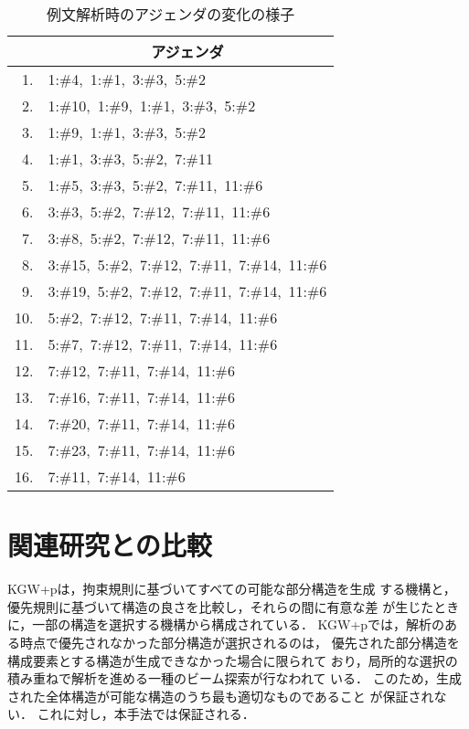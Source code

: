 \begin{table}
\caption{例文解析時のアジェンダの変化の様子}
\label{tab:agenda}
\begin{center}
\begin{tabular}{r|l}\hline
&\multicolumn{1}{|c}{アジェンダ}\\\hline\hline
1. &1:\#4,\ 1:\#1,\ 3:\#3,\ 5:\#2\\
2. &1:\#10,\ 1:\#9,\ 1:\#1,\ 3:\#3,\ 5:\#2\\
3. &1:\#9,\ 1:\#1,\ 3:\#3,\ 5:\#2\\
4. &1:\#1,\ 3:\#3,\ 5:\#2,\ 7:\#11\\
5. &1:\#5,\ 3:\#3,\ 5:\#2,\ 7:\#11,\ 11:\#6\\
6. &3:\#3,\ 5:\#2,\ 7:\#12,\ 7:\#11,\ 11:\#6\\
7. &3:\#8,\ 5:\#2,\ 7:\#12,\ 7:\#11,\ 11:\#6\\
8. &3:\#15,\ 5:\#2,\ 7:\#12,\ 7:\#11,\ 7:\#14,\ 11:\#6\\
9. &3:\#19,\ 5:\#2,\ 7:\#12,\ 7:\#11,\ 7:\#14,\ 11:\#6\\
10.&5:\#2,\ 7:\#12,\ 7:\#11,\ 7:\#14,\ 11:\#6\\
11.&5:\#7,\ 7:\#12,\ 7:\#11,\ 7:\#14,\ 11:\#6\\
12.&7:\#12,\ 7:\#11,\ 7:\#14,\ 11:\#6\\
13.&7:\#16,\ 7:\#11,\ 7:\#14,\ 11:\#6\\
14.&7:\#20,\ 7:\#11,\ 7:\#14,\ 11:\#6\\
15.&7:\#23,\ 7:\#11,\ 7:\#14,\ 11:\#6\\
16.&7:\#11,\ 7:\#14,\ 11:\#6\\\hline
\end{tabular}
\end{center}
\end{table}

\section{関連研究との比較}
\label{sec:comparison}

KGW+p\cite{Tsujii88}は，拘束規則に基づいてすべての可能な部分構造を生成
する機構と，優先規則に基づいて構造の良さを比較し，それらの間に有意な差
が生じたときに，一部の構造を選択する機構から構成されている．
KGW+pでは，解析のある時点で優先されなかった部分構造が選択されるのは，
優先された部分構造を構成要素とする構造が生成できなかった場合に限られて
おり，局所的な選択の積み重ねで解析を進める一種のビーム探索が行なわれて
いる．
このため，生成された全体構造が可能な構造のうち最も適切なものであること
が保証されない．
これに対し，本手法では保証される． 

